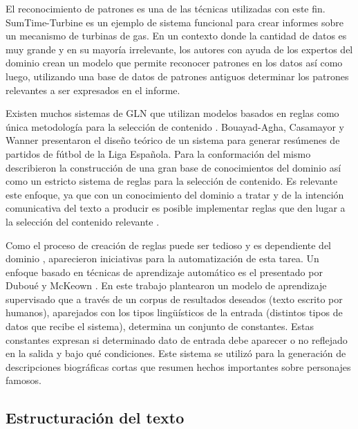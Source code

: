     El reconocimiento de patrones es una de las t\'ecnicas utilizadas con este fin.  SumTime-Turbine  es un ejemplo de sistema funcional para crear
 informes sobre un mecanismo de turbinas de gas. En un contexto donde la cantidad de datos es muy grande y en su mayoría irrelevante, 
 los autores con ayuda de los expertos del dominio crean un modelo que permite reconocer patrones en los datos así como luego, utilizando una base de datos de patrones 
antiguos determinar los patrones relevantes a ser expresados en el informe. 

    Existen muchos sistemas de GLN que utilizan modelos basados en reglas como \'unica metodolog\'ia para la selecci\'on de contenido . Bouayad-Agha, Casamayor y 
Wanner  presentaron el dise\~no te\'orico de un sistema para generar resúmenes de partidos de 
fútbol de la Liga Espa\~nola. Para la conformaci\'on del mismo describieron la construcci\'on de una gran base de conocimientos del dominio as\'i como 
un estricto sistema de reglas para la selecci\'on de contenido. Es relevante este enfoque, ya que con un conocimiento del dominio a tratar y de la intenci\'on comunicativa del texto a producir 
es posible implementar reglas que den lugar a la selección del contenido relevante . 

    Como el proceso de creaci\'on de reglas puede ser tedioso y es dependiente del dominio , aparecieron iniciativas para la automatizaci\'on de esta tarea. Un enfoque 
basado en t\'ecnicas de aprendizaje autom\'atico es el presentado por Dubou\'e y McKeown . En este trabajo plantearon un modelo de aprendizaje supervisado que a trav\'es de
un corpus de resultados deseados (texto escrito por humanos), aparejados con los tipos lingüísticos de la entrada (distintos tipos de datos que recibe el sistema), determina un conjunto de constantes. Estas constantes 
expresan si determinado dato de entrada debe aparecer o no reflejado en la salida y bajo qué condiciones. Este sistema se utilizó para la generación de descripciones biográficas cortas que resumen hechos 
importantes sobre personajes famosos.

\subsection{Estructuración del texto}\label{subsection:estructuracion}

